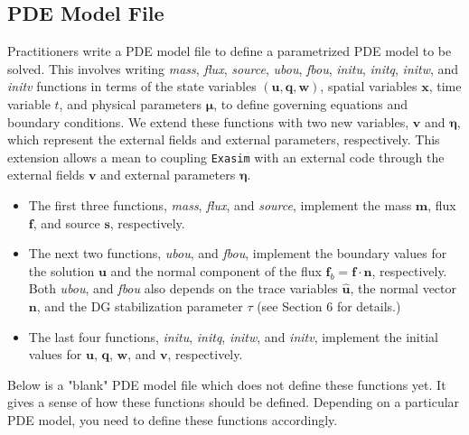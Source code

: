 \documentclass[11pt]{article}
\begin{document}
\subsection{PDE Model File}

Practitioners write a PDE model file to define a parametrized PDE model to be solved.  This involves writing  {\em mass}, {\em flux},  {\em source}, {\em ubou},  {\em fbou},  {\em initu}, {\em initq}, {\em initw}, and {\em initv} functions in terms of the state variables $(\bm u, \bm q, \bm w)$, spatial variables $\bm x$, time variable $t$, and physical parameters $\bm \mu$, to define governing equations and boundary conditions. We extend these functions with two new variables, $\bm v$ and $\bm \eta$, which represent the external fields and external parameters, respectively. This extension allows a mean to coupling \texttt{Exasim} with an external code through the external fields $\bm v$ and external parameters $\bm \eta$. 

\begin{itemize}
\item The first three functions,  {\em mass},  {\em flux}, and  {\em source},  implement the mass $\bm m$, flux $\bm f$, and source $\bm s$, respectively. 

\item The next two functions,  {\em ubou}, and {\em fbou}, implement the boundary values for the solution $\bm u$ and the normal component of the flux $\bm f_b = \bm f \cdot \bm n$, respectively. Both  {\em ubou}, and {\em fbou} also depends on the trace variables $\widehat{\bm{u}}$, the normal vector $\bm n$, and the DG stabilization parameter $\tau$ (see Section 6 for details.) 

\item The last four functions, {\em initu}, {\em initq}, {\em initw}, and {\em initv}, implement the initial values for $\bm u$, $\bm q$, $\bm w$, and $\bm v$, respectively. 
\end{itemize}

Below is a "blank" PDE model file which does not define these functions yet. It gives a sense of how these functions should be defined. Depending on a particular PDE model, you need to define these functions accordingly. 
\end{document}
